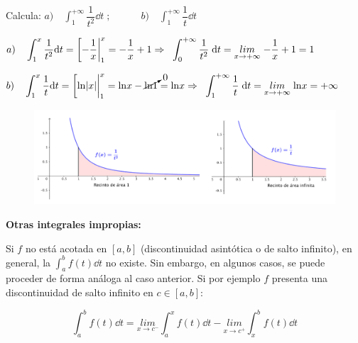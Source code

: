 \begin{miejercicio}

Calcula: $a) \quad \displaystyle \int_1^{+\infty} \dfrac {1}{t^2} \dd t\; ; \qquad \quad b) \quad \displaystyle \int_1^{+\infty} \dfrac 1 t \dd t $	

$a)\quad \displaystyle \int_1^x \dfrac {1}{t^2} \dd t= \eval[-\dfrac{1}{x}|_1^x=-\dfrac 1 x + 1 \Rightarrow \; \;  \displaystyle \int_0^{+\infty} \dfrac {1}{t^2}\; \dd t = \underset{x\to + \infty}{lim}\;{-\dfrac 1 x + 1}=1$

$b) \quad \displaystyle \int_1^x \dfrac 1 t \dd t = \eval[\mathrm{ln}\abs{x}|_1^x=\mathrm{ln}x-\cancelto{0}{\mathrm{ln}1}=\mathrm{ln}x \Rightarrow \;\; \displaystyle \int_1^{+\infty} \dfrac {1}{t}\; \dd t = \underset{x\to + \infty}{lim}\;{\mathrm{ln}x}=+\infty$

\begin{figure}[H]
 	\centering
	\includegraphics[width=1\textwidth]{imagenes/IMPROPIAS/T08IM10.png}
\end{figure}

\vspace{4mm} \end{miejercicio}

\vspace{4mm} \textbf{Otras integrales impropias:}



Si $f$ no está acotada en $[a,b]$ (discontinuidad asintótica o de salto infinito), en general, la $\displaystyle \int_a^b f(t) \dd t$ no existe. Sin embargo, en algunos casos, se puede proceder de forma análoga al caso anterior. Si por ejemplo $f$ presenta una discontinuidad de salto infinito en $c\in[a,b]$:

$$\displaystyle \int_a^b f(t) \dd t= \underset {x\to c^-}{lim}{\int_a^x f(t) \dd t}-\underset {x\to c^+}{lim}{\int_x^b f(t) \dd t}$$


